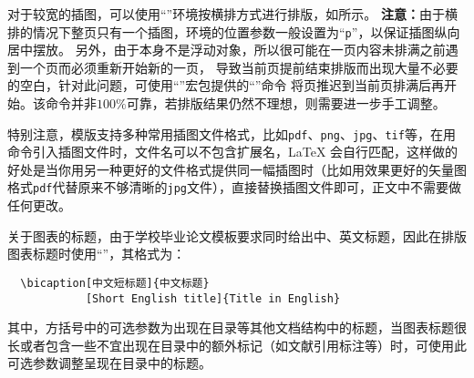 对于较宽的插图，可以使用“”环境按横排方式进行排版，如所示。
\textbf{注意：}由于横排的情况下整页只有一个插图，环境的位置参数一般设置为“\texttt{p}”，以保证插图纵向居中摆放。
另外，由于本身不是浮动对象，所以很可能在一页内容未排满之前遇到一个页而必须重新开始新的一页，
导致当前页提前结束排版而出现大量不必要的空白，针对此问题，可使用“”宏包提供的“”命令
将页推迟到当前页排满后再开始。该命令并非$100\%$可靠，若排版结果仍然不理想，则需要进一步手工调整。


特别注意，模版支持多种常用插图文件格式，比如\texttt{pdf}、\texttt{png}、\texttt{jpg}、\texttt{tif}等，在用命令引入插图文件时，文件名可以不包含扩展名，\LaTeX{} 会自行匹配，这样做的好处是当你用另一种更好的文件格式提供同一幅插图时（比如用效果更好的矢量图格式\texttt{pdf}代替原来不够清晰的\texttt{jpg}文件），直接替换插图文件即可，正文中不需要做任何更改。

关于图表的标题，由于学校毕业论文模板要求同时给出中、英文标题，因此在排版图表标题时使用“”，其格式为：
\begin{verbatim}
  \bicaption[中文短标题]{中文标题}
            [Short English title]{Title in English}
\end{verbatim}
其中，方括号中的可选参数为出现在目录等其他文档结构中的标题，当图表标题很长或者包含一些不宜出现在目录中的额外标记（如文献引用标注等）时，可使用此可选参数调整呈现在目录中的标题。

